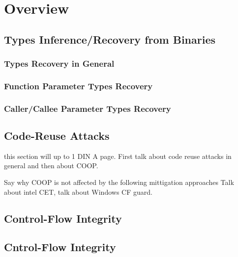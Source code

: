 \chapter{Overview}
\label{chapter:Overview}

\section{Types Inference/Recovery from Binaries}
\subsection{Types Recovery in General}
\subsection{Function Parameter Types Recovery}
\subsection{Caller/Callee Parameter Types Recovery}

\section{Code-Reuse Attacks}
this section will up to 1 DIN A page. First talk about code reuse attacks in general and then 
about COOP.

Say why COOP is not affected by the following mittigation approaches
Talk about intel CET, talk about Windows CF guard.


\section{Control-Flow Integrity}

\section{Cntrol-Flow Integrity}